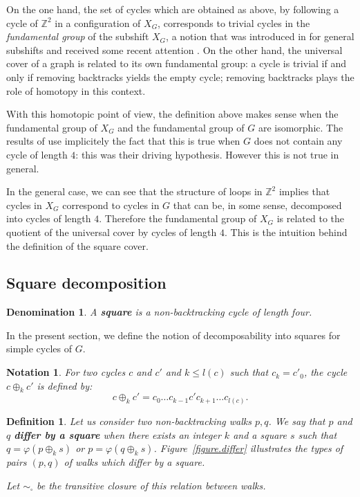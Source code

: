\documentclass{article}
\newtheorem{definition}[theorem]{Definition}
\newtheorem{notation}[theorem]{Notation}
\newtheorem{denomination}[theorem]{Denomination}
\begin{document}
On the one hand, the set of cycles which are obtained as above, by following a cycle of $\mathbb Z^2$ in a configuration of $X_G$, corresponds to trivial cycles in the \emph{fundamental group} of the subshift $X_G$, a notion that was introduced in \cite{GP95} for general subshifts and received some recent attention \cite{PV22}. On the other hand, the universal cover of a graph is related to its own fundamental group: a cycle is trivial if and only if removing backtracks yields the empty cycle; removing backtracks plays the role of homotopy in this context. 

With this homotopic point of view, the definition above makes sense when the fundamental group of $X_G$ and the fundamental group of $G$ are isomorphic. The results of \cite{CM18} use implicitely the fact that this is true when $G$ does not contain any cycle of length $4$: this was their driving hypothesis. However this is not true in general.

In the general case, we can see that the structure of loops in $\mathbb Z^2$ implies that cycles in $X_G$ correspond to cycles in $G$ that can be, in some sense, decomposed into cycles of length $4$. Therefore the fundamental group of $X_G$ is related to the quotient of the universal cover by cycles of length $4$.
This is the intuition behind the definition of the square cover.

\subsection{Square decomposition}\label{sec:square}

\begin{denomination}
A \textbf{square} is a non-backtracking cycle of length four.
\end{denomination}

In the present section, we define the notion of decomposability into squares for simple cycles of $G$.

\begin{notation}
    For two cycles $c$ and $c'$ and $k \le l(c)$ such that $c_k = c'_0$, the cycle $c {\oplus}_{k} c'$ is defined by:
\[c {\oplus}_{k} c' = c_0 \hdots c_{k-1} c' c_{k+1} \hdots c_{l(c)}.\]
\end{notation}


\begin{definition}
Let us consider two non-backtracking walks $p,q$. We say that $p$ and $q$ \textbf{differ by a square} when there exists an integer $k$ and a square $s$ such that 
$q = \varphi(p {\oplus}_k s)$ or 
$p = \varphi(q {\oplus}_k s)$.
Figure~\ref{figure.differ} illustrates the types of pairs $(p,q)$ of walks which differ by a square. 

Let $\sim_{\square}$ be the transitive closure of this relation between walks.
\end{definition}
\end{document}
